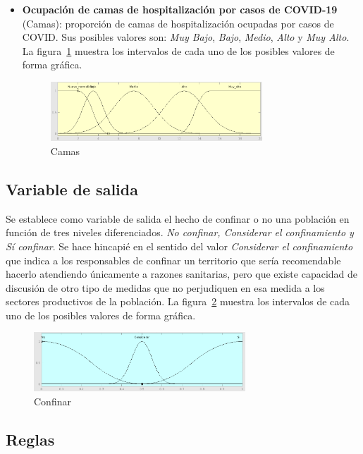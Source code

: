 \documentclass[12pt,a4paper, xcolor=table]{article}
\begin{document}
\begin{itemize}
    \item \textbf{Ocupación de camas de hospitalización por casos de COVID-19} (Camas): proporción de camas de hospitalización ocupadas por casos de COVID. Sus posibles valores son: \textit{Muy Bajo}, \textit{Bajo}, \textit{Medio}, {\textit{Alto}} y {\textit{Muy Alto}}. La figura~\ref{Camas} muestra los intervalos de cada uno de los posibles valores de forma gráfica.

    \begin{figure}[!h]
      \centering
      \includegraphics[width=300px]{img/ocupacion_camas.png}
      \caption{Camas}
      \label{Camas}
    \end{figure}

    \end{itemize}

\subsection{Variable de salida}

Se establece como variable de salida el hecho de confinar o no una población en función de tres niveles diferenciados. \textit{No confinar, Considerar el confinamiento y Sí confinar}. Se hace hincapié en el sentido del valor \textit{Considerar el confinamiento} que indica a los responsables de confinar un territorio que sería recomendable hacerlo atendiendo únicamente a razones sanitarias, pero que existe capacidad de discusión de otro tipo de medidas que no perjudiquen en esa medida a los sectores productivos de la población. La figura~\ref{Confinar} muestra los intervalos de cada uno de los posibles valores de forma gráfica.

\begin{figure}[!h]
  \centering
  \includegraphics[width=300px]{img/confinar.png}
  \caption{Confinar}
  \label{Confinar}
\end{figure}
\newpage
\subsection{Reglas}
\end{document}
